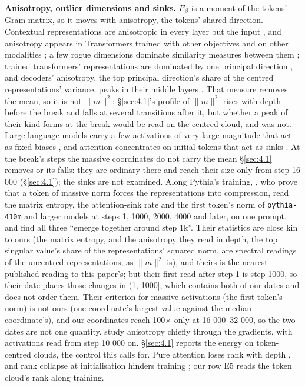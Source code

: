 \documentclass[11pt]{article}
\begin{document}
\textbf{Anisotropy, outlier dimensions and sinks.} $E_\beta $ is a moment of the tokens' Gram matrix, so it moves with anisotropy, the tokens' shared direction. Contextual representations are anisotropic in every layer but the input \citep{ethayarajh2019}, and anisotropy appears in Transformers trained with other objectives and on other modalities \citep{godey2024}; a few rogue dimensions dominate similarity measures between them \citep{timkey2021}; trained transformers' representations are dominated by one principal direction \citep{benartzy2026}, and decoders' anisotropy, the top principal direction's share of the centred representations' variance, peaks in their middle layers \citep{razzhigaev2023}. That measure removes the mean, so it is not $\|m\|^{2}$: \S\ref{sec:4.1}'s profile of $\|m\|^{2}$ rises with depth before the break and falls at several transitions after it, but whether a peak of their kind forms at the break would be read on the centred cloud, and was not. Large language models carry a few activations of very large magnitude that act as fixed biases \citep{sun2024}, and attention concentrates on initial tokens that act as sinks \citep{xiao2023}. At the break's steps the massive coordinates do not carry the mean \S\ref{sec:4.1} removes or its falls: they are ordinary there and reach their size only from step 16 000 (\S\ref{sec:4.1}); the sinks are not examined. Along Pythia's training, \citet{queipo2025}, who prove that a token of massive norm forces the representations into compression, read the matrix entropy, the attention-sink rate and the first token's norm of \texttt{pythia-410m} and larger models at steps 1, 1000, 2000, 4000 and later, on one prompt, and find all three ``emerge together around step 1k''. Their statistics are close kin to ours (the matrix entropy, and the anisotropy they read in depth, the top singular value's share of the representations' squared norm, are spectral readings of the uncentred representations, as $\|m\|^{2}$ is), and theirs is the nearest published reading to this paper's; but their first read after step 1 is step 1000, so their date places those changes in (1, 1000], which contains both of our dates and does not order them. Their criterion for massive activations (the first token's norm) is not ours (one coordinate's largest value against the median coordinate's), and our coordinates reach 100$\times $ only at 16 000--32 000, so the two dates are not one quantity. \citet{bernas2026} study anisotropy chiefly through the gradients, with activations read from step 10 000 on. \S\ref{sec:4.1} reports the energy on token-centred clouds, the control this calls for. Pure attention loses rank with depth \citep{dong2021}, and rank collapse at initialisation hinders training \citep{noci2022}; our row E5 reads the token cloud's rank along training.
\end{document}

